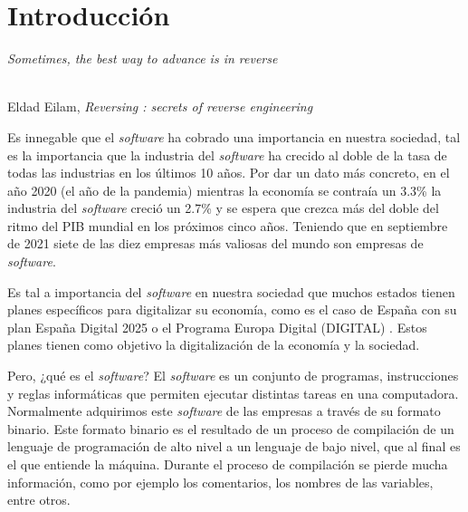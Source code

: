 \chapter{Introducción}
\label{cap:introducion}

\setcounter{page}{1}

\begin{flushright}
    \begin{minipage}[]{10cm}
        \emph{Sometimes, the best way to advance is in reverse}\\
    \end{minipage}\\

    Eldad Eilam, \textit{Reversing : secrets of reverse engineering}\\
\end{flushright}

\vspace{1cm}


Es innegable que el \textit{software} ha cobrado una importancia en nuestra sociedad, tal es
la importancia que la industria del \textit{software} ha crecido al doble de la tasa de todas
las industrias en los últimos 10 años. Por dar un dato más concreto, en el año 2020
(el año de la pandemia) mientras la economía se contraía un 3.3\% la industria del
\textit{software} creció un 2.7\% y se espera que crezca más del doble del ritmo del PIB
mundial en los próximos cinco años. Teniendo que en septiembre de 2021 siete de las
diez empresas más valiosas del mundo son empresas de \textit{software}. \cite{IndustriaSoftware}

Es tal a importancia del \textit{software} en nuestra sociedad que muchos estados tienen planes
específicos para digitalizar su economía, como es el caso de España con su plan
España Digital 2025 o el Programa Europa Digital (DIGITAL) \cite{EspañaDigital2025}
\cite{ProgramaEuropaDigital}. Estos planes tienen como objetivo la digitalización
de la economía y la sociedad.

Pero, ¿qué es el \textit{software}? El \textit{software} es un conjunto de programas, instrucciones
y reglas informáticas que permiten ejecutar distintas tareas en una computadora.
\cite{Software} Normalmente adquirimos este \textit{software} de las empresas a través de
su formato binario. Este formato binario es el resultado de un proceso de compilación
de un lenguaje de programación de alto nivel a un lenguaje de bajo nivel, que al final
es el que entiende la máquina. Durante el proceso de compilación se pierde mucha
información, como por ejemplo los comentarios, los nombres de las variables, entre
otros.

